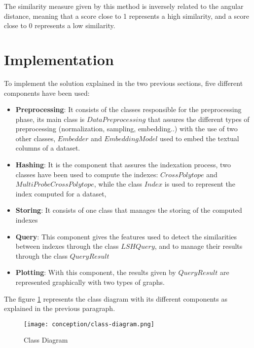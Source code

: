The similarity measure given by this method is inversely related to the angular
distance, meaning that a score close to 1 represents a high similarity, and a
score close to 0 represents a low similarity.


\section{Implementation}
\label{sect:concep_implementation}
To implement the solution explained in the two previous sections, five different
components have been used:

\begin{itemize}
    \item \textbf{Preprocessing}: It consists of the classes responsible for the
    preprocessing phase, its main class is $DataPreprocessing$ that assures the
    different types of preprocessing (normalization, sampling, embedding..) with
    the use of two other classes, $Embedder$ and $EmbeddingModel$ used to embed
    the textual columns of a dataset.
    \item \textbf{Hashing}: It is the component that assures the indexation
    process, two classes have been used to compute the indexes:
    $CrossPolytope$ and $MultiProbeCrossPolytope$, while the class $Index$ is
    used to represent the index computed for a dataset, 
    \item \textbf{Storing}: It consists of one class that manages the storing
    of the computed indexes
    \item \textbf{Query}: This component gives the features used to detect the
    similarities between indexes through the class $LSHQuery$, and to manage
    their results through the class $QueryResult$
    \item \textbf{Plotting}: With this component, the results given by
    $QueryResult$ are represented graphically with two types of graphs.
\end{itemize}

The figure \ref{fig:class_diagram} represents the class diagram with its
different components as explained in the previous paragraph.

\begin{figure}[h]
    \centering
    \texttt{[image: conception/class-diagram.png]}
    \caption{Class Diagram}
    \label{fig:class_diagram}
\end{figure}